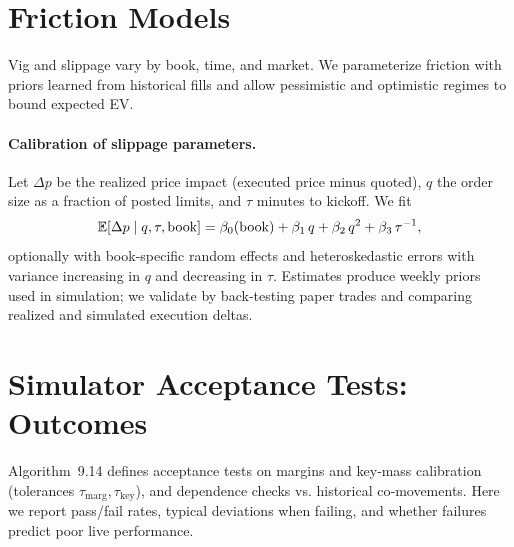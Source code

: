 \section{Friction Models}
Vig and slippage vary by book, time, and market. We parameterize friction with priors learned from historical fills and allow pessimistic and optimistic regimes to bound expected EV.

\paragraph{Calibration of slippage parameters.}
Let $\Delta p$ be the realized price impact (executed price minus quoted), $q$ the order size as a fraction of posted limits, and $\tau$ minutes to kickoff. We fit
\[\mathbb{E}[\Delta p\mid q,\tau,\text{book}]=\beta_0(\text{book})+\beta_1\,q+\beta_2\,q^2+\beta_3\,\tau^{-1},\]
optionally with book‑specific random effects and heteroskedastic errors with variance increasing in $q$ and decreasing in $\tau$. Estimates produce weekly priors used in simulation; we validate by back‑testing paper trades and comparing realized and simulated execution deltas.


\section{Simulator Acceptance Tests: Outcomes}\label{sec:sim-acceptance-outcomes}
Algorithm~9.14 defines acceptance tests on margins and key‑mass calibration (tolerances $\tau_{\mathrm{marg}},\tau_{\mathrm{key}}$), and dependence checks vs. historical co‑movements. Here we report pass/fail rates, typical deviations when failing, and whether failures predict poor live performance.

